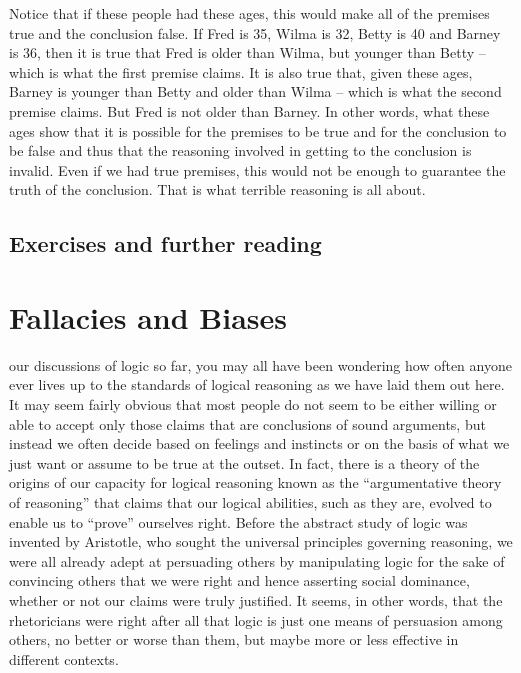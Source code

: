 \documentclass[justified]{tufte-book}
\begin{document}
Notice that if these people had these ages, this would make all of the premises true and the conclusion false. If Fred is 35, Wilma is 32, Betty is 40 and Barney is 36, then it is true that Fred is older than Wilma, but younger than Betty -- which is what the first premise claims. It is also true that, given these ages, Barney is younger than Betty and older than Wilma -- which is what the second premise claims. But Fred is not older than Barney. In other words, what these ages show that it is possible for the premises to be true and for the conclusion to be false and thus that the reasoning involved in getting to the conclusion is invalid. Even if we had true premises, this would not be enough to guarantee the truth of the conclusion. That is what terrible reasoning is all about.

\hypertarget{exercises-and-further-reading}{%
\section*{Exercises and further reading}\label{exercises-and-further-reading}}

\hypertarget{fallacies-and-biases}{%
\chapter{Fallacies and Biases}\label{fallacies-and-biases}}

 our discussions of logic so far, you may all have been wondering how often anyone ever lives up to the standards of logical reasoning as we have laid them out here. It may seem fairly obvious that most people do not seem to be either willing or able to accept only those claims that are conclusions of sound arguments, but instead we often decide based on feelings and instincts or on the basis of what we just want or assume to be true at the outset. In fact, there is a theory of the origins of our capacity for logical reasoning known as the ``argumentative theory of reasoning'' that claims that our logical abilities, such as they are, evolved to enable us to ``prove'' ourselves right. Before the abstract study of logic was invented by Aristotle, who sought the universal principles governing reasoning, we were all already adept at persuading others by manipulating logic for the sake of convincing others that we were right and hence asserting social dominance, whether or not our claims were truly justified. It seems, in other words, that the rhetoricians were right after all that logic is just one means of persuasion among others, no better or worse than them, but maybe more or less effective in different contexts.
\end{document}
